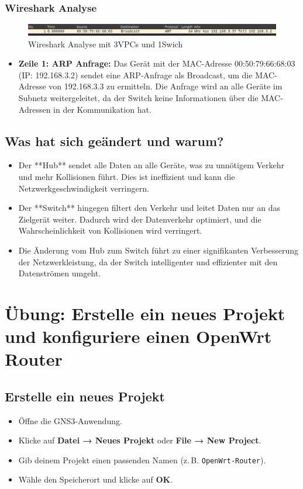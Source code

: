 \documentclass[12pt, a4paper]{article}\usepackage{listings}
\begin{document}
\subsubsection{Wireshark Analyse}
\begin{figure}[hbtp]
	\centering
	\includegraphics[width=1\textwidth]{images/Wireshark_Ping_Switch.png}
	\caption{Wireshark Analyse mit 3VPCs und 1Swich}
	\label{fig:HUB-Analyse}
\end{figure}
\begin{itemize}
    \item \textbf{Zeile 1: ARP Anfrage:}  
    Das Gerät mit der MAC-Adresse 00:50:79:66:68:03 (IP: 192.168.3.2) sendet eine ARP-Anfrage als Broadcast, um die MAC-Adresse von 192.168.3.3 zu ermitteln. Die Anfrage wird an alle Geräte im Subnetz weitergeleitet, da der Switch keine Informationen über die MAC-Adressen in der Kommunikation hat.
\end{itemize}

\subsection{Was hat sich geändert und warum?}
\begin{itemize}
    \item Der **Hub** sendet alle Daten an alle Geräte, was zu unnötigem Verkehr und mehr Kollisionen führt. Dies ist ineffizient und kann die Netzwerkgeschwindigkeit verringern.
    \item Der **Switch** hingegen filtert den Verkehr und leitet Daten nur an das Zielgerät weiter. Dadurch wird der Datenverkehr optimiert, und die Wahrscheinlichkeit von Kollisionen wird verringert.
    \item Die Änderung vom Hub zum Switch führt zu einer signifikanten Verbesserung der Netzwerkleistung, da der Switch intelligenter und effizienter mit den Datenströmen umgeht.
\end{itemize}

\newpage
\section{Übung: Erstelle ein neues Projekt und konfiguriere einen OpenWrt Router}

\subsection{Erstelle ein neues Projekt}
\begin{itemize}
    \item Öffne die GNS3-Anwendung.
    \item Klicke auf \textbf{Datei → Neues Projekt} oder \textbf{File → New Project}.
    \item Gib deinem Projekt einen passenden Namen (z.\,B. \texttt{OpenWrt-Router}).
    \item Wähle den Speicherort und klicke auf \textbf{OK}.
\end{itemize}
\end{document}
